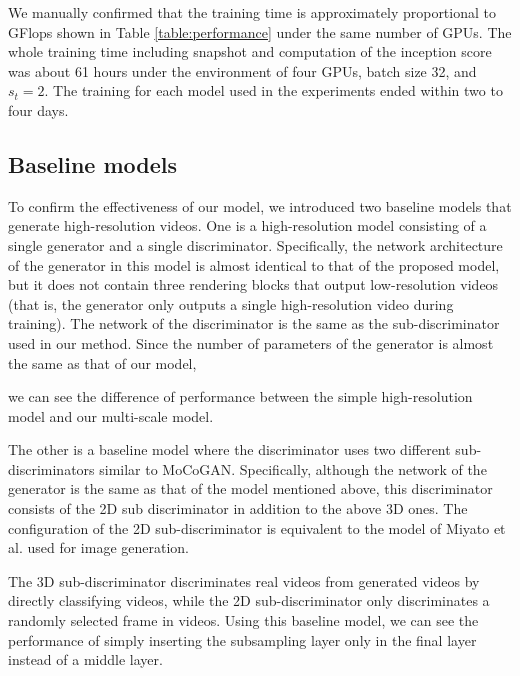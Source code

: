 \documentclass[twocolumn]{svjour3}
\def\Table#1{Table \ref{table:#1}}
\begin{document}
We manually confirmed that the training time is approximately proportional to GFlops shown in \Table{performance} under the same number of GPUs.
The whole training time including snapshot and computation of the inception score was about 61 hours under the environment of four GPUs, batch size 32, and $s_t=2$.
The training for each model used in the experiments ended within two to four days.





\subsection{Baseline models}
\label{sec:baselines}




To confirm the effectiveness of our model, we introduced two baseline models that generate high-resolution videos.
One is a high-resolution model consisting of a single generator and a single discriminator.
Specifically, the network architecture of the generator in this model is almost identical to that of the proposed model,
but it does not contain three rendering blocks that output low-resolution videos (that is, the generator only outputs a single high-resolution video during training).
The network of the discriminator is the same as the sub-discriminator used in our method.
Since the number of parameters of the generator is almost the same as that of our model,

we can see the difference of performance between the simple high-resolution model and our multi-scale model.


The other is a baseline model where the discriminator uses two different sub-discriminators similar to MoCoGAN.
Specifically, although the network of the generator is the same as that of the model mentioned above,
this discriminator consists of the 2D sub\discretionary{-}{-}{-} discriminator in addition to the above 3D ones.
The configuration of the 2D sub-discriminator is equivalent to the model of Miyato et al. \cite{Miyato2018} used for image generation.


The 3D sub-discriminator discriminates real videos from generated videos by directly classifying videos,
while the 2D sub-discriminator only discriminates a randomly selected frame in videos.
Using this baseline model, we can see the performance of simply inserting
the subsampling layer only in the final layer instead of a middle layer.
\end{document}
